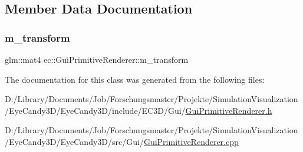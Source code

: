 \subsection{Member Data Documentation}
\mbox{\label{classec_1_1_gui_primitive_renderer_a7ebd149e4d4e0b043d928391041000bf}} 
\subsubsection{\texorpdfstring{m\+\_\+transform}{m\_transform}}
{\footnotesize\ttfamily glm\+::mat4 ec\+::\+Gui\+Primitive\+Renderer\+::m\+\_\+transform\hspace{0.3cm}{\ttfamily [protected]}}



The documentation for this class was generated from the following files\+:\begin{DoxyCompactItemize}
\item 
D\+:/\+Library/\+Documents/\+Job/\+Forschungsmaster/\+Projekte/\+Simulation\+Visualization/\+Eye\+Candy3\+D/\+Eye\+Candy3\+D/include/\+E\+C3\+D/\+Gui/\mbox{\hyperlink{_gui_primitive_renderer_8h}{Gui\+Primitive\+Renderer.\+h}}\item 
D\+:/\+Library/\+Documents/\+Job/\+Forschungsmaster/\+Projekte/\+Simulation\+Visualization/\+Eye\+Candy3\+D/\+Eye\+Candy3\+D/src/\+Gui/\mbox{\hyperlink{_gui_primitive_renderer_8cpp}{Gui\+Primitive\+Renderer.\+cpp}}\end{DoxyCompactItemize}
